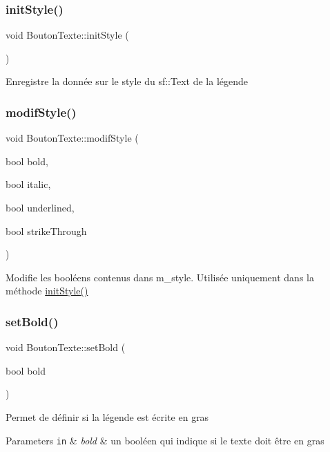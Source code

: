 \subsubsection{\texorpdfstring{init\+Style()}{initStyle()}}
{\footnotesize\ttfamily void Bouton\+Texte\+::init\+Style (\begin{DoxyParamCaption}{ }\end{DoxyParamCaption})\hspace{0.3cm}{\ttfamily [protected]}}

Enregistre la donnée sur le style du sf\+::\+Text de la légende \mbox{\label{classBoutonTexte_a418fb00a38049d07199fc619fe4e31d3}} 
\subsubsection{\texorpdfstring{modif\+Style()}{modifStyle()}}
{\footnotesize\ttfamily void Bouton\+Texte\+::modif\+Style (\begin{DoxyParamCaption}\item[{bool}]{bold,  }\item[{bool}]{italic,  }\item[{bool}]{underlined,  }\item[{bool}]{strike\+Through }\end{DoxyParamCaption})\hspace{0.3cm}{\ttfamily [protected]}}

Modifie les booléens contenus dans m\+\_\+style. Utilisée uniquement dans la méthode \hyperlink{classBoutonTexte_ab1ffba678bd0b224149859d2925cb49b}{init\+Style()} \mbox{\label{classBoutonTexte_afcaf8ea6421d4ded5cee30739553c17e}} 
\subsubsection{\texorpdfstring{set\+Bold()}{setBold()}}
{\footnotesize\ttfamily void Bouton\+Texte\+::set\+Bold (\begin{DoxyParamCaption}\item[{bool}]{bold }\end{DoxyParamCaption})}

Permet de définir si la légende est écrite en gras 
\begin{DoxyParams}[1]{Parameters}
\mbox{\tt in}  & {\em bold} & un booléen qui indique si le texte doit être en gras \\
\hline
\end{DoxyParams}
\mbox{\label{classBoutonTexte_aa1be3dfb869765c3fb3af4d44d0736ed}} 
